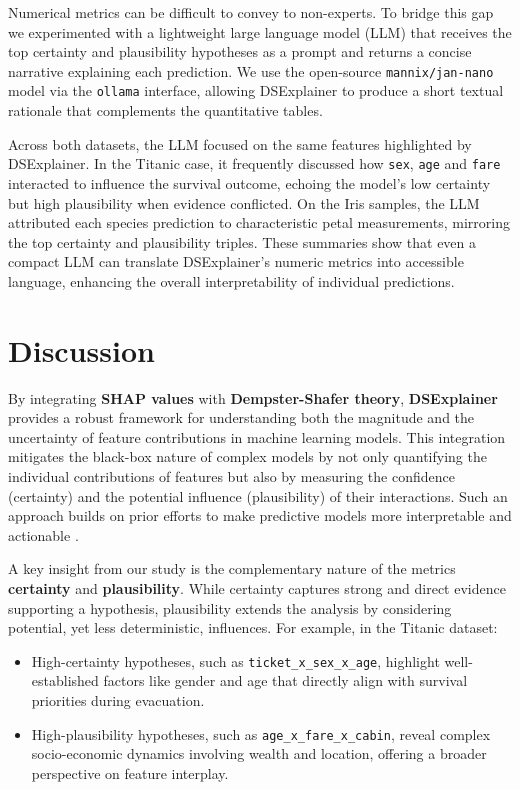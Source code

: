 \documentclass[acmlarge]{acmart}
\begin{document}
Numerical metrics can be difficult to convey to non-experts. To bridge this gap we experimented with a lightweight large language model (LLM) that receives the top certainty and plausibility hypotheses as a prompt and returns a concise narrative explaining each prediction. We use the open-source \texttt{mannix/jan-nano} model via the \texttt{ollama} interface, allowing DSExplainer to produce a short textual rationale that complements the quantitative tables.

Across both datasets, the LLM focused on the same features highlighted by DSExplainer. In the Titanic case, it frequently discussed how \texttt{sex}, \texttt{age} and \texttt{fare} interacted to influence the survival outcome, echoing the model's low certainty but high plausibility when evidence conflicted. On the Iris samples, the LLM attributed each species prediction to characteristic petal measurements, mirroring the top certainty and plausibility triples. These summaries show that even a compact LLM can translate DSExplainer's numeric metrics into accessible language, enhancing the overall interpretability of individual predictions.


\section{Discussion}
\label{sec:discussion}

By integrating \textbf{SHAP values} with \textbf{Dempster-Shafer theory}, \textbf{DSExplainer} provides a robust framework for understanding both the magnitude and the uncertainty of feature contributions in machine learning models. This integration mitigates the black-box nature of complex models by not only quantifying the individual contributions of features but also by measuring the confidence (certainty) and the potential influence (plausibility) of their interactions. Such an approach builds on prior efforts to make predictive models more interpretable and actionable \cite{lundberg2017unified, zhang2021evidential}.

A key insight from our study is the complementary nature of the metrics \textbf{certainty} and \textbf{plausibility}. While certainty captures strong and direct evidence supporting a hypothesis, plausibility extends the analysis by considering potential, yet less deterministic, influences. For example, in the Titanic dataset:
\begin{itemize}
    \item High-certainty hypotheses, such as \texttt{ticket\_x\_sex\_x\_age}, highlight well-established factors like gender and age that directly align with survival priorities during evacuation.

    \item High-plausibility hypotheses, such as \texttt{age\_x\_fare\_x\_cabin}, reveal complex socio-economic dynamics involving wealth and location, offering a broader perspective on feature interplay.
\end{itemize}
\end{document}
